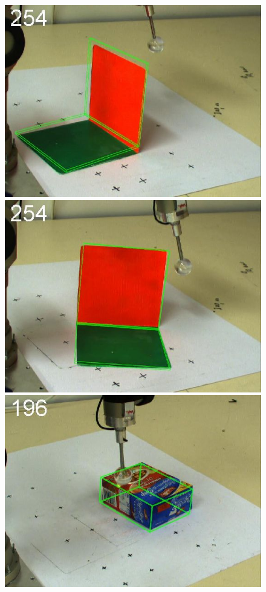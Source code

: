 \begin{figure}[htbp]
{}
\centerline{
\includegraphics[width=\imgAXwid]{images/A1_2exp_667_4}
\includegraphics[width=\imgAXwid]{images/A1_2exp_876_4}
\includegraphics[width=\imgAXwid]{images/A2_2exp_399_4}
}
\end{figure}
